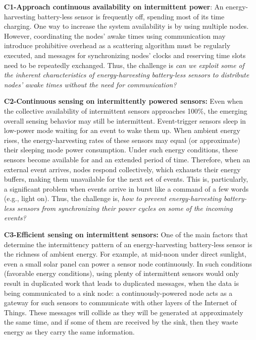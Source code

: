 \noindent\textbf{C1-Approach continuous availability on intermittent power}: 
An energy-harvesting battery-less sensor is frequently off, spending most of its time charging. 
One way to increase the system availability is by using multiple nodes.
However, coordinating the nodes' awake times using communication may introduce prohibitive overhead as a scattering algorithm must be regularly executed, and messages for synchronizing nodes' clocks and reserving time slots need to be repeatedly exchanged.
Thus, the challenge is \emph{can we exploit some of the inherent characteristics of energy-harvesting battery-less sensors to distribute nodes' awake times without the need for communication?}

\noindent\textbf{C2-Continuous sensing on intermittently powered sensors:}  
Even when the collective availability of intermittent sensors approaches 100\%, the emerging overall sensing behavior may still be intermittent. 
Event-trigger sensors sleep in low-power mode waiting for an event to wake them up. 
When ambient energy rises, the energy-harvesting rates of these sensors may equal (or approximate) their sleeping mode power consumption.
Under such energy conditions, these sensors become available for and an extended period of time. 
Therefore, when an external event arrives, nodes respond collectively, which exhausts their energy buffers, making them unavailable for the next set of events. 
This is, particularly, a significant problem when events arrive in burst like a command of a few words (e.g., light on). 
Thus, the challenge is, \emph{how to prevent energy-harvesting battery-less sensors from synchronizing their power cycles on some of the incoming events?}

\noindent\textbf{C3-Efficient sensing on intermittent sensors:} 
One of the main factors that determine the intermittency pattern of an energy-harvesting battery-less sensor is the richness of ambient energy. 
For example, at mid-noon under direct sunlight, even a small solar panel can power a sensor node continuously. 
In such conditions (favorable energy conditions), using plenty of intermittent sensors would only result in duplicated work that leads to duplicated messages, when the data is being communicated to a sink node: a continuously-powered node acts as a gateway for such sensors to communicate with other layers of the Internet of Things. These messages will collide as they will be generated at approximately the same time, and if some of them are received by the sink, then they waste energy as they carry the same information.  
%
